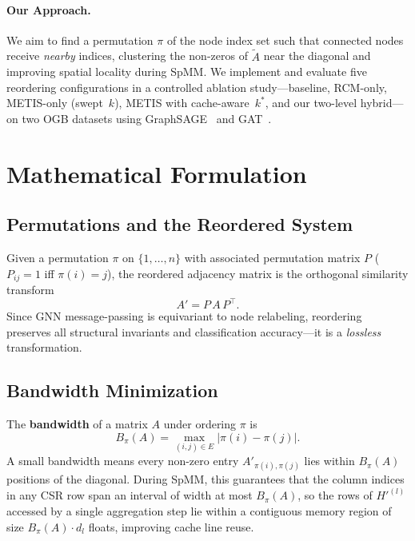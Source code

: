 \documentclass[sigconf,review]{acmart}
\begin{document}
\paragraph{Our Approach.}
We aim to find a permutation $\pi$ of the node index set such that connected nodes receive \emph{nearby} indices, clustering the non-zeros of $\tilde{A}$ near the diagonal and improving spatial locality during SpMM. We implement and evaluate five reordering configurations in a controlled ablation study---baseline, RCM-only, METIS-only (swept~$k$), METIS with cache-aware~$k^*$, and our two-level hybrid---on two OGB datasets using GraphSAGE~\cite{hamilton2017sage} and GAT~\cite{velickovic2018gat}.

\section{Mathematical Formulation}
\label{sec:math}

\subsection{Permutations and the Reordered System}

Given a permutation $\pi$ on $\{1,\dots,n\}$ with associated permutation matrix $P$ ($P_{ij}=1$ iff $\pi(i)=j$), the reordered adjacency matrix is the orthogonal similarity transform
\begin{equation}\label{eq:perm}
    A' = P\, A\, P^\top.
\end{equation}
Since GNN message-passing is equivariant to node relabeling, reordering preserves all structural invariants and classification accuracy---it is a \emph{lossless} transformation.

\subsection{Bandwidth Minimization}
\label{sec:bandwidth}

The \textbf{bandwidth} of a matrix $A$ under ordering $\pi$ is
\begin{equation}\label{eq:bw}
    B_\pi(A) = \max_{(i,j)\in E} \bigl|\pi(i) - \pi(j)\bigr|.
\end{equation}
A small bandwidth means every non-zero entry $A'_{\pi(i),\pi(j)}$ lies within $B_\pi(A)$ positions of the diagonal. During SpMM, this guarantees that the column indices in any CSR row span an interval of width at most $B_\pi(A)$, so the rows of $H'^{(l)}$ accessed by a single aggregation step lie within a contiguous memory region of size $B_\pi(A) \cdot d_l$ floats, improving cache line reuse.
\end{document}

